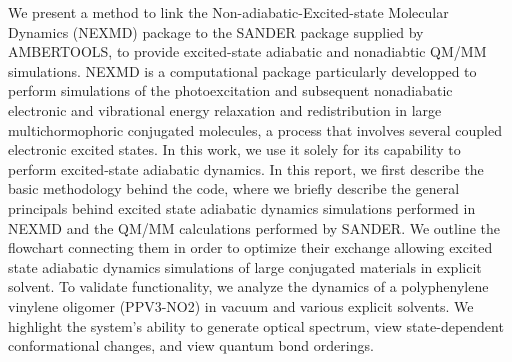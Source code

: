 We present a method to link the Non-adiabatic-Excited-state Molecular Dynamics (NEXMD) package to the SANDER package supplied by AMBERTOOLS, to provide excited-state adiabatic and nonadiabtic QM/MM simulations.
NEXMD is a computational package particularly developped to perform simulations of the photoexcitation and subsequent nonadiabatic electronic and vibrational energy relaxation and redistribution in large multichormophoric conjugated molecules, a process that involves several coupled electronic excited states.
In this work, we use it solely for its capability to perform excited-state adiabatic dynamics.
In this report, we first describe the basic methodology behind the code, where we briefly describe the general principals behind excited state adiabatic dynamics simulations performed in NEXMD and the QM/MM calculations performed by SANDER.
We outline the flowchart connecting them in order to optimize their exchange allowing excited state adiabatic dynamics simulations of large conjugated materials in explicit solvent.
To validate functionality, we analyze the dynamics of a polyphenylene vinylene oligomer (PPV3-NO2) in vacuum and various explicit solvents.
We highlight the system's ability to generate optical spectrum, view state-dependent conformational changes, and view quantum bond orderings.
